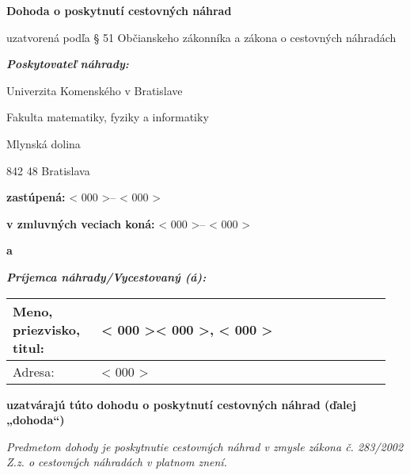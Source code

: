 \documentclass[10pt,a4paper]{article}
\newcommand{\placeholder}[1]{< #1 >}
\newcommand{\firstName}{\placeholder{000}}
\newcommand{\lastName}{\placeholder{000}}
\newcommand{\academicDegree}{\placeholder{000}}
\newcommand{\address}{\placeholder{000}}
\newcommand{\incumbentNameA}{\placeholder{000}}
\newcommand{\incumbentNameB}{\placeholder{000}}
\newcommand{\positionNameA}{\placeholder{000}}
\newcommand{\positionNameB}{\placeholder{000}}
\begin{document}
\begin{center}
	{\LARGE\bf Dohoda o poskytnutí cestovných náhrad}
	\vspace*{1em}
	
	uzatvorená podľa § 51 Občianskeho zákonníka a zákona o cestovných náhradách
\end{center}

\vspace*{1em}
\textbf{\textit{Poskytovateľ náhrady:}}
\vspace*{1em}

Univerzita Komenského v Bratislave

Fakulta matematiky, fyziky a informatiky

Mlynská dolina

842 48 Bratislava

\vspace*{1em}
\textbf{zastúpená:} \incumbentNameA -- \positionNameA

\textbf{v zmluvných veciach koná:} \incumbentNameB -- \positionNameB

\vspace*{-1em}
\begin{center}
	\textbf{a}
\end{center}
\vspace*{-0.5em}

\textbf{\textit{Príjemca náhrady/Vycestovaný (á):}}
\vspace*{-1em}

\def\arraystretch{1.2}
\begin{table}[h!]
\centering
\begin{tabular}{|p{0.224\linewidth}|p{0.724\linewidth}|}
	\hline
	Meno, priezvisko, titul: & \firstName \lastName, \academicDegree \\ \hline
	Adresa: & \address \\
	\hline
\end{tabular}
\end{table}

\vspace*{-1em}
\begin{center}
	\textbf{uzatvárajú túto dohodu o poskytnutí cestovných náhrad (ďalej „dohoda“)}
\end{center}

\textit{Predmetom dohody je poskytnutie cestovných náhrad v zmysle zákona č. 283/2002 Z.z. o cestovných náhradách v platnom znení.}
\end{document}
